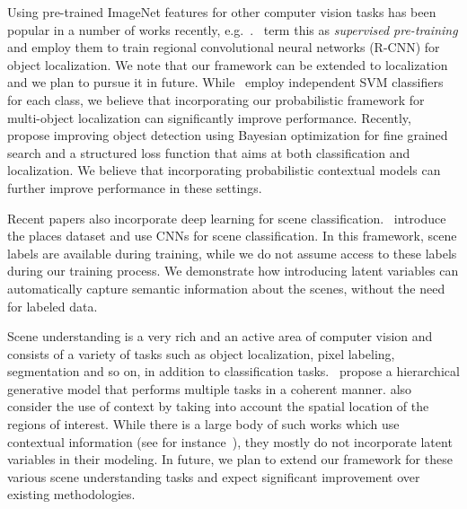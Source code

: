 \documentclass{article}
\begin{document}
Using pre-trained ImageNet features for other computer vision tasks has been popular in a number of works recently, e.g.~\cite{transferable,girshick2014rich,oquab2014learning}.~\cite{girshick2014rich} term this as {\em supervised pre-training} and employ them to train regional convolutional neural networks (R-CNN) for object localization. We note that our framework can be extended to
localization and we plan to pursue it in future.  While~\cite{girshick2014rich} employ independent SVM classifiers for each class, we believe that incorporating our probabilistic framework for multi-object localization can significantly improve performance.
Recently,~\cite{zhang2015improving} propose improving object detection using Bayesian optimization for fine grained search and a structured loss function that aims at both classification and localization. We believe that incorporating probabilistic contextual models can further improve performance in these settings.


Recent papers also incorporate deep learning for scene classification.~\cite{zhou2014learning,zhou2014object} introduce the places dataset and use CNNs for scene classification. In this framework, scene labels are available during training, while we do not assume access to these labels during our training process. We demonstrate how introducing latent variables can automatically capture semantic information about the scenes, without the need for labeled data.



Scene understanding is a very rich and an active area of computer vision and consists of a variety of tasks such as object localization, pixel labeling, segmentation and so on, in addition to classification tasks.~\cite{li2009towards} propose a hierarchical generative model that performs multiple tasks in a coherent manner. \cite{li2011theta} also consider the use of context by taking into account the spatial location of the regions of interest.
While there is a large body of such works which use contextual information (see for instance~\cite{li2011theta}), they mostly  do not incorporate latent variables in their modeling.  In future, we plan to extend our framework for these various scene understanding tasks and expect significant improvement over existing methodologies.
\end{document}
